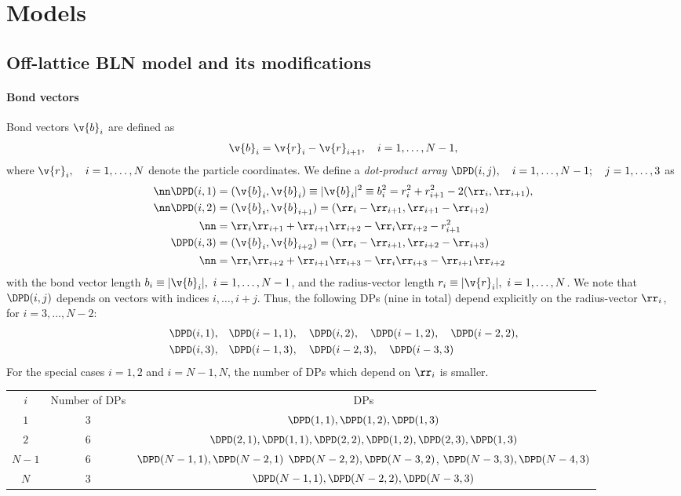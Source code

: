 \chapter{Models}

\section{Off-lattice BLN model and its modifications}

\subsubsection{Bond vectors}

Bond vectors $\v{b}_i$ are defined as 
\begin{equation}
  \v{b}_i=\v{r}_i-\v{r}_{i+1},\quad i=1,\ldots,N-1,
  \label{bln-def-bv}
\end{equation}
where $\v{r}_i,\quad i=1,\ldots,N$ denote the particle coordinates. We define
a \emph{dot-product array} $\DPD(i,j),\quad i=1,\ldots, N-1;\quad j=1,\ldots,3$ as
\begin{align}
  \nn\DPD(i,1)&=(\v{b}_i,\v{b}_i)\equiv |\v{b}_i|^2\equiv b_i^2=r_i^2+r_{i+1}^2-2(\rr_i,\rr_{i+1}),\\
  \nn\DPD(i,2)&=(\v{b}_i,\v{b}_{i+1})=(\rr_i-\rr_{i+1},\rr_{i+1}-\rr_{i+2})\\
\nn&=\rr_i\rr_{i+1}+\rr_{i+1}\rr_{i+2}-\rr_i\rr_{i+2}-r_{i+1}^2\\
  \DPD(i,3)&=(\v{b}_i,\v{b}_{i+2})=(\rr_i-\rr_{i+1},\rr_{i+2}-\rr_{i+3})\\
\nn&=\rr_i\rr_{i+2}+\rr_{i+1}\rr_{i+3}-\rr_{i}\rr_{i+3}-\rr_{i+1}\rr_{i+2}
  \label{bln-def-dpd}
\end{align}
with the bond vector length $b_i\equiv|\v{b}_i|,\ i=1,\ldots,N-1$, 
and the radius-vector length $r_i\equiv|\v{r}_i|,\ i=1,\ldots,N$.
We note that $\DPD(i,j)$ depends on vectors with indices $i,\ldots,i+j$. Thus,
the following DPs (nine in total) depend explicitly on the radius-vector $\rr_i$, for $i=3,\ldots,N-2$:
\begin{align*}
 \DPD(i,1),&\quad\DPD(i-1,1),\quad\DPD(i,2),\quad\DPD(i-1,2),\quad\DPD(i-2,2),\\ 
 \DPD(i,3),&\quad\DPD(i-1,3),\quad\DPD(i-2,3),\quad\DPD(i-3,3)
\end{align*}
For the special cases $i=1,2$ and $i=N-1,N$, the number of DPs which 
depend on $\rr_i$ is smaller. 
\begin{table}
  \centering
  \begin{tabular}{ccc}
   $i$ 		& Number of DPs		&	DPs \\ 
   $1$		& 3			&	$\DPD(1,1),\DPD(1,2),\DPD(1,3)$ \\
   $2$		& 6			&	$\DPD(2,1),\DPD(1,1),\DPD(2,2),\DPD(1,2),\DPD(2,3),\DPD(1,3)$ \\
   $N-1$	& 6			&	$\DPD(N-1,1),\DPD(N-2,1)$
						$\DPD(N-2,2),\DPD(N-3,2)$,
						$\DPD(N-3,3),\DPD(N-4,3)$	\\	
   $N$		& 3			&	$\DPD(N-1,1),\DPD(N-2,2),\DPD(N-3,3)$ \\
  \end{tabular}
\end{table}
